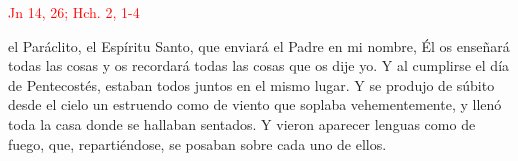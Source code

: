 \hfill\textcolor{red}{Jn 14, 26; Hch. 2, 1-4}

el Paráclito, el Espíritu Santo, que enviará el Padre en mi nombre, Él os enseñará todas las cosas y os recordará todas las cosas que os dije yo.
Y al cumplirse el día de Pentecostés, estaban todos juntos en el mismo lugar. Y se produjo de súbito desde el cielo un estruendo como de viento que soplaba vehementemente,
y llenó toda la casa donde se hallaban sentados. Y vieron aparecer lenguas como de fuego, que, repartiéndose, se posaban sobre cada uno de ellos. 